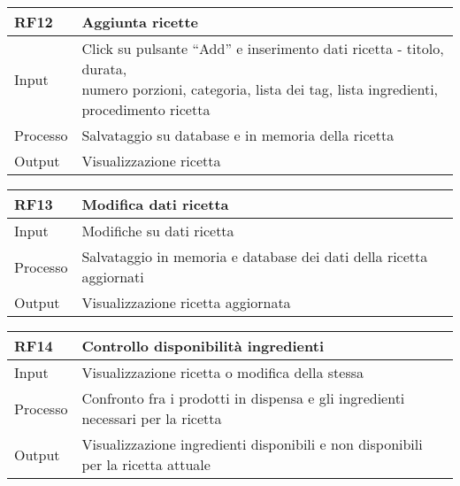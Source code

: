 \begin{table}[H]
    \begin{flushleft}
      \begin{tabular}{l|l}
        \toprule
        \textbf{RF12} & \textbf{Aggiunta ricette}\\
        \midrule
        Input & \makecell{Click su pulsante “Add” e inserimento dati ricetta - titolo, durata, \\ numero porzioni, categoria, lista dei tag, lista ingredienti, procedimento ricetta}\\
        Processo & Salvataggio su database e in memoria della ricetta\\
        Output & Visualizzazione ricetta\\
        \bottomrule
      \end{tabular}
    \end{flushleft}
\end{table}

\begin{table}[H]
    \begin{flushleft}
      \begin{tabular}{l|l}
        \toprule
        \textbf{RF13} & \textbf{Modifica dati ricetta}\\
        \midrule
        Input & Modifiche su dati ricetta\\
        Processo & Salvataggio in memoria e database dei dati della ricetta aggiornati\\
        Output & Visualizzazione ricetta aggiornata\\
        \bottomrule
      \end{tabular}
    \end{flushleft}
\end{table}

\begin{table}[H]
    \begin{flushleft}
      \begin{tabular}{l|l}
        \toprule
        \textbf{RF14} & \textbf{Controllo disponibilità ingredienti}\\
        \midrule
        Input & Visualizzazione ricetta o modifica della stessa\\
        Processo & Confronto fra i prodotti in dispensa e gli ingredienti necessari per la ricetta\\
        Output & Visualizzazione ingredienti disponibili e non disponibili per la ricetta attuale\\
        \bottomrule
      \end{tabular}
    \end{flushleft}
\end{table}

